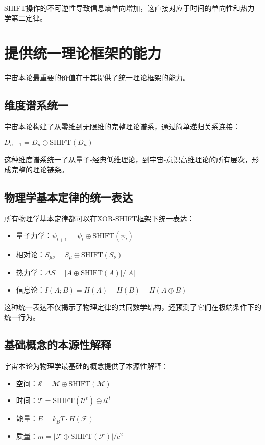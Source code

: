 SHIFT操作的不可逆性导致信息熵单向增加，这直接对应于时间的单向性和热力学第二定律。

\section{提供统一理论框架的能力}

宇宙本论最重要的价值在于其提供了统一理论框架的能力。

\subsection{维度谱系统一}

宇宙本论构建了从零维到无限维的完整理论谱系，通过简单递归关系连接：

$D_{n+1} = D_n \oplus \text{SHIFT}(D_n)$

这种维度谱系统一了从量子-经典低维理论，到宇宙-意识高维理论的所有层次，形成完整的理论链条。

\subsection{物理学基本定律的统一表达}

所有物理学基本定律都可以在XOR-SHIFT框架下统一表达：

\begin{itemize}
  \item 量子力学：$\psi_{t+1} = \psi_t \oplus \text{SHIFT}(\psi_t)$
  \item 相对论：$S_{\mu\nu} = S_{\mu} \oplus \text{SHIFT}(S_{\nu})$
  \item 热力学：$\Delta S = |A \oplus \text{SHIFT}(A)|/|A|$
  \item 信息论：$I(A;B) = H(A) + H(B) - H(A \oplus B)$
\end{itemize}

这种统一表达不仅揭示了物理定律的共同数学结构，还预测了它们在极端条件下的统一行为。

\subsection{基础概念的本源性解释}

宇宙本论为物理学最基础的概念提供了本源性解释：

\begin{itemize}
  \item 空间：$\mathcal{S} = \mathcal{M} \oplus \text{SHIFT}(\mathcal{M})$
  \item 时间：$\mathcal{T} = \text{SHIFT}(\mathcal{U}^t) \oplus \mathcal{U}^t$
  \item 能量：$E = k_B T \cdot H(\mathcal{F})$
  \item 质量：$m = |\mathcal{F} \oplus \text{SHIFT}(\mathcal{F})|/c^2$
\end{itemize}

